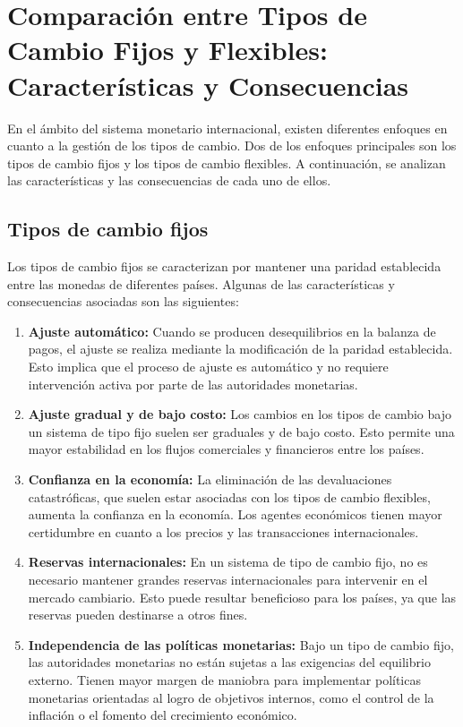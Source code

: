 \documentclass[
  a4paper,
]{article}
\begin{document}
\hypertarget{comparaciuxf3n-entre-tipos-de-cambio-fijos-y-flexibles-caracteruxedsticas-y-consecuencias}{%
\section{Comparación entre Tipos de Cambio Fijos y Flexibles:
Características y
Consecuencias}\label{comparaciuxf3n-entre-tipos-de-cambio-fijos-y-flexibles-caracteruxedsticas-y-consecuencias}}

En el ámbito del sistema monetario internacional, existen diferentes
enfoques en cuanto a la gestión de los tipos de cambio. Dos de los
enfoques principales son los tipos de cambio fijos y los tipos de cambio
flexibles. A continuación, se analizan las características y las
consecuencias de cada uno de ellos.

\hypertarget{tipos-de-cambio-fijos}{%
\subsection{Tipos de cambio fijos}\label{tipos-de-cambio-fijos}}

Los tipos de cambio fijos se caracterizan por mantener una paridad
establecida entre las monedas de diferentes países. Algunas de las
características y consecuencias asociadas son las siguientes:

\begin{enumerate}
\def\labelenumi{\arabic{enumi}.}
\item
  \textbf{Ajuste automático:} Cuando se producen desequilibrios en la
  balanza de pagos, el ajuste se realiza mediante la modificación de la
  paridad establecida. Esto implica que el proceso de ajuste es
  automático y no requiere intervención activa por parte de las
  autoridades monetarias.
\item
  \textbf{Ajuste gradual y de bajo costo:} Los cambios en los tipos de
  cambio bajo un sistema de tipo fijo suelen ser graduales y de bajo
  costo. Esto permite una mayor estabilidad en los flujos comerciales y
  financieros entre los países.
\item
  \textbf{Confianza en la economía:} La eliminación de las devaluaciones
  catastróficas, que suelen estar asociadas con los tipos de cambio
  flexibles, aumenta la confianza en la economía. Los agentes económicos
  tienen mayor certidumbre en cuanto a los precios y las transacciones
  internacionales.
\item
  \textbf{Reservas internacionales:} En un sistema de tipo de cambio
  fijo, no es necesario mantener grandes reservas internacionales para
  intervenir en el mercado cambiario. Esto puede resultar beneficioso
  para los países, ya que las reservas pueden destinarse a otros fines.
\item
  \textbf{Independencia de las políticas monetarias:} Bajo un tipo de
  cambio fijo, las autoridades monetarias no están sujetas a las
  exigencias del equilibrio externo. Tienen mayor margen de maniobra
  para implementar políticas monetarias orientadas al logro de objetivos
  internos, como el control de la inflación o el fomento del crecimiento
  económico.
\end{enumerate}
\end{document}
